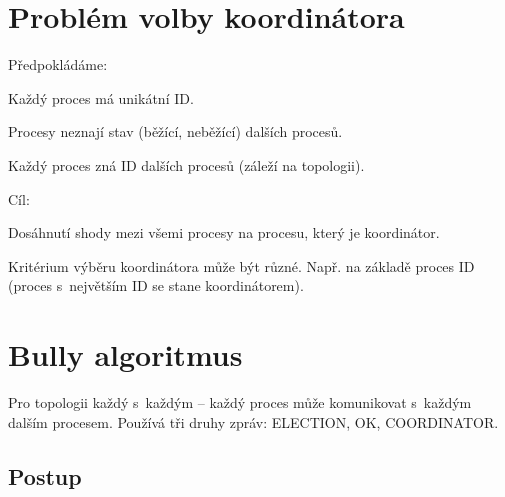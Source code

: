 
\section{Problém volby koordinátora}

\begin{compactitem}
    \item Předpokládáme:
    \begin{compactitem}
        \item Každý proces má unikátní ID.
        \item Procesy neznají stav (běžící, neběžící) dalších procesů.
        \item Každý proces zná ID dalších procesů (záleží na topologii).
    \end{compactitem}
    \item Cíl:
    \begin{compactitem}
        \item Dosáhnutí shody mezi všemi procesy na procesu, který je koordinátor.
        \item Kritérium výběru koordinátora může být různé. Např. na základě proces ID (proces s~největším ID se stane koordinátorem).
    \end{compactitem}
\end{compactitem}


\section{Bully algoritmus}

Pro topologii každý s~každým -- každý proces může komunikovat s~každým dalším procesem. Používá tři druhy zpráv: ELECTION, OK, COORDINATOR.

\subsection{Postup}

